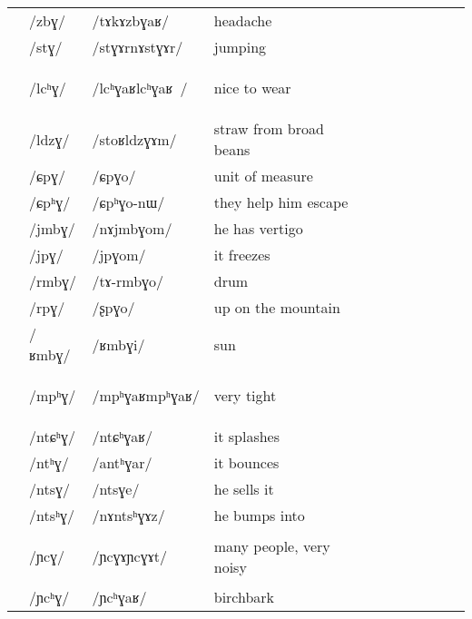 \documentclass[oneside,a4paper,11pt]{article}
\newcommand{\ipa}[1]{\mbox{\phon/#1/}}
\newcommand{\deux}[1]{\ipa{#1}\addtocounter{2clusters}{1}}
\newcommand{\trois}[1]{\ipa{#1}\addtocounter{3clusters}{1}}
\newcommand{\idph}[1]{\cellcolor{gray}\textbf{#1}}
\newcommand{\resetcounters}[2]{
\newcounter{#1}
\newcounter{#2}
 \setcounter{#1}{\value{2clusters}}
  \setcounter{#2}{\value{3clusters}}
 \setcounter{2clusters}{0}
  \setcounter{3clusters}{0}
}
\begin{document}
\begin{table}
{\begin{tabular}{l|lll|lll|lll|l}
	&\trois{zbɣ}  	&\ipa{tɤkɤzbɣaʁ}  	&headache	&	&	&\\
		&\trois{stɣ}  	&\ipa{stɣɤrnɤstɣɤr}  	& jumping	&	&	&\\
\midrule						
	&\trois{lcʰɣ} \idph{} 	&\ipa{lcʰɣaʁlcʰɣaʁ }  	&nice to wear	&	&	&\\
	&\trois{ldzɣ}  	&\ipa{stoʁldzɣɤm}  	&straw from broad beans 	&	&	&\\
\midrule				
&\deux{ɕpɣ}		&\ipa{ɕpɣo}  	&unit of measure	&	&	&\\
	&\trois{ɕpʰɣ}  	&\ipa{ɕpʰɣo-nɯ}  	&they help him escape	&	&	&\\
\midrule						
	&\trois{jmbɣ}  	&\ipa{nɤjmbɣom}  	&he has vertigo	&	&	&\\
	&\trois{jpɣ}  	&\ipa{jpɣom}  	&it freezes	&	&	&\\
\midrule						
 	&\trois{rmbɣ}  	&\ipa{tɤ-rmbɣo}  	&drum	&	&	&\\
	&\trois{rpɣ}  	&\ipa{ʂpɣo}  	&up on the mountain	&	&	&\\
\midrule						
	&\trois{ʁmbɣ}  	&\ipa{ʁmbɣi}  	&sun	&	&	&\\
\midrule		
	&\trois{mpʰɣ}\idph{}   	&\ipa{mpʰɣaʁmpʰɣaʁ}  	&very tight	&	&	&\\				
	&\trois{ntɕʰɣ}  	&\ipa{ntɕʰɣaʁ}  	&it splashes	&	&	&\\
	&\trois{ntʰɣ}  	&\ipa{antʰɣar}  	&it bounces	&	&	&\\
	&\trois{ntsɣ}  	&\ipa{ntsɣe}  	&he sells it	&	&	&\\
	&\trois{ntsʰɣ}  	&\ipa{nɤntsʰɣɤz}  	&he bumps into	&	&	&\\
	&\trois{ɲcɣ}\idph{}  	&\ipa{ɲcɣɤɲcɣɤt}  	&many people, very noisy	&	&	&\\
	&\trois{ɲcʰɣ}  	&\ipa{ɲcʰɣaʁ}  	&birchbark	&	&	&\\
\end{tabular}}
\end{table}	
\resetcounters{2Cg}{3Cg} %
\ADD{\value{2wszC}}{\value{2lrC}}{\totdeux}
\ADD{\totdeux}{\value{2jcC}}{\totdeux}
\ADD{\totdeux}{\value{2xgC}}{\totdeux}
\ADD{\totdeux}{\value{2nC}}{\totdeux}
\ADD{\totdeux}{\value{2Cjw}}{\totdeux}
\ADD{\totdeux}{\value{2Clr}}{\totdeux}
\ADD{\totdeux}{\value{2Cg}}{\totdeux}

 \ADD{\value{3wszC}}{\value{3lrC}}{\tottrois}
\ADD{\tottrois}{\value{3jcC}}{\tottrois}
\ADD{\tottrois}{\value{3xgC}}{\tottrois}
\ADD{\tottrois}{\value{3nC}}{\tottrois}
\ADD{\tottrois}{\value{3Cjw}}{\tottrois}
\ADD{\tottrois}{\value{3Clr}}{\tottrois}
\ADD{\tottrois}{\value{3Cg}}{\tottrois}
\end{document}
